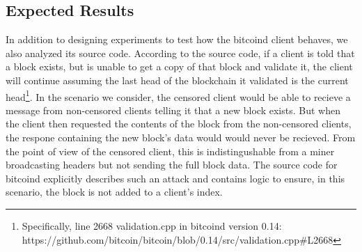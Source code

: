 \subsection{Expected Results}
In addition to designing experiments to test how the bitcoind client behaves, we also analyzed its source code. According to the source code, if a client is told that a block exists, but is unable to get a copy of that block and validate it, the client will continue assuming the last head of the blockchain it validated is the current head\footnote{Specifically, line 2668 validation.cpp in bitcoind version 0.14: https://github.com/bitcoin/bitcoin/blob/0.14/src/validation.cpp#L2668}. In the scenario we consider, the censored client would be able to recieve a message from non-censored clients telling it that a new block exists. But when the client then requested the contents of the block from the non-censored clients, the respone containing the new block's data would would never be recieved. From the point of view of the censored client, this is indistingushable from a miner broadcasting headers but not sending the full block data. The source code for bitcoind explicitly describes such an attack and contains logic to ensure, in this scenario, the block is not added to a client's index.

\begin{figure}[h]
\end{figure}
